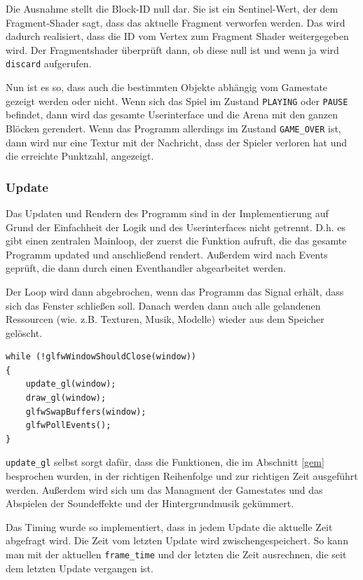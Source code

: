 \documentclass[11pt]{article}
\newcommand{\lstin}[1]{\lstinline[language=C]{#1}}
\begin{document}
Die Ausnahme stellt die Block-ID null dar. Sie ist ein Sentinel-Wert, der dem Fragment-Shader sagt, 
dass das aktuelle Fragment verworfen werden. Das wird dadurch realisiert, dass die ID vom Vertex zum Fragment Shader weitergegeben wird.
Der Fragmentshader überprüft dann, ob diese null ist und wenn ja wird \lstin{discard} aufgerufen.

Nun ist es so, dass auch die bestimmten Objekte abhängig vom Gamestate gezeigt werden oder nicht.
Wenn sich das Spiel im Zustand \lstin{PLAYING} oder \lstin{PAUSE} befindet, dann wird das gesamte Userinterface und die Arena mit den ganzen Blöcken gerendert.
Wenn das Programm allerdings im Zustand \lstin{GAME_OVER} ist, 
dann wird nur eine Textur mit der Nachricht, dass der Spieler verloren hat und die erreichte Punktzahl, angezeigt. 

\subsubsection{Update}

Das Updaten und Rendern des Programm sind in der Implementierung 
auf Grund der Einfachheit der Logik und des Userinterfaces nicht getrennt. D.h. es gibt einen zentralen Mainloop, der zuerst die Funktion aufruft, 
die das gesamte Programm updated und anschließend rendert. Außerdem wird nach Events geprüft, die dann durch einen Eventhandler abgearbeitet werden.

Der Loop wird dann abgebrochen, wenn das Programm das Signal erhält, dass sich das Fenster schließen soll. 
Danach werden dann auch alle gelandenen Ressourcen (wie. z.B. Texturen, Musik, Modelle) wieder aus dem Speicher gelöscht.

\begin{lstlisting}
while (!glfwWindowShouldClose(window))
{
    update_gl(window);
    draw_gl(window);
    glfwSwapBuffers(window);
    glfwPollEvents();
}
\end{lstlisting}

\lstin{update_gl} selbst sorgt dafür, dass die Funktionen, die im Abschnitt \ref{gem} besprochen wurden, 
in der richtigen Reihenfolge und zur richtigen Zeit ausgeführt werden. Außerdem wird sich um das Managment der Gamestates und das Abspielen der Soundeffekte und der Hintergrundmusik gekümmert.

Das Timing wurde so implementiert, dass in jedem Update die aktuelle Zeit abgefragt wird. 
Die Zeit vom letzten Update wird zwischengespeichert. So kann man mit der aktuellen \lstin{frame_time} 
und der letzten die Zeit ausrechnen, die seit dem letzten Update vergangen ist.
\end{document}
